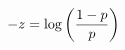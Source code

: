 \documentclass[preview]{standalone}
\begin{document}
\begin{align*}
\special{dvisvgm:raw <g id='unique000'>}-z=\log{\left(\frac{1-p}{p}\right)}\special{dvisvgm:raw </g>}
\end{align*}
\end{document}
